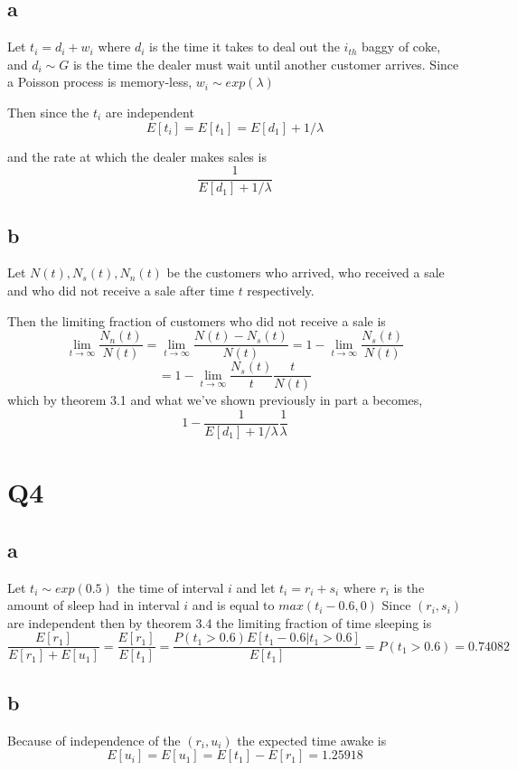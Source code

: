 \documentclass{article}
\begin{document}
\subsection*{a}

Let $t_i = d_i + w_i$ where $d_i$ is the time it takes to deal out the $i_{th}$ baggy of coke, and $d_i \sim G$ is the time the dealer must wait until another customer arrives. Since a Poisson process is memory-less, $w_i \sim exp(\lambda)$

Then since the $t_i$ are independent
$$E[t_i] = E[t_1] = E[d_1] + 1/\lambda$$ 

and the rate at which the dealer makes sales is
$$
\frac{1}{E[d_1] + 1/\lambda}
$$

\subsection*{b}
Let $N(t), N_s(t), N_n(t)$ be the customers who arrived, who received a sale and who did not receive a sale after time $t$ respectively. 

Then the limiting fraction of customers who did not receive a sale is 
$$
\lim_{t \to \infty} \frac{N_n(t)}{N(t)}
=
\lim_{t \to \infty} \frac{N(t) - N_s(t)}{N(t)} = 1 - \lim_{t \to \infty} \frac{N_s(t)}{N(t)}
$$
$$
= 1 - \lim_{t \to \infty} \frac{N_s(t)}{t}\frac{t}{N(t)}
$$
which by theorem 3.1 and what we've shown previously in part a becomes,
$$
1 - \frac{1}{E[d_1] + 1/\lambda} \frac{1}{\lambda}
$$

\section*{Q4}
\subsection*{a}
Let $t_i \sim exp(0.5)$ the time of interval $i$ and let $t_i = r_i + s_i$ where $r_i$ is the amount of sleep had in interval $i$ and is equal to $max(t_i - 0.6, 0)$ 
Since $(r_i, s_i)$ are independent then by theorem 3.4 the limiting fraction of time sleeping is
$$
\frac{E[r_1]}{E[r_1] + E[u_1]} = \frac{E[r_1]}{E[t_1]} = \frac{P(t_1>0.6)E[t_1 - 0.6| t_1 > 0.6]}{E[t_1]} = P(t_1 > 0.6) = 0.74082
$$
\subsection*{b}
Because of independence of the $(r_i, u_i)$  the expected time awake is
$$
E[u_i] = E[u_1] = E[t_1] - E[r_1] = 1.25918
$$
\end{document}
